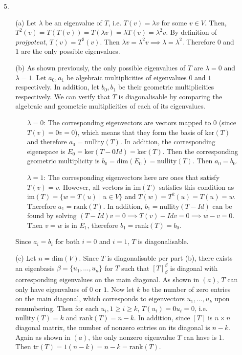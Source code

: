 \documentclass{article}
\begin{document}
\newpage

\begin{itemize}
	\item [5.]
	      \begin{itemize}
		      \item [(a)] Let $\lambda$ be an eigenvalue of $T$, i.e. $T(v)=\lambda v$ for some $v\in V$. Then, $T^2(v)=T(T(v))=T(\lambda v)=\lambda T(v)=\lambda^2v$. By definition of \textit{projpotent}, $T(v)=T^2(v)$. Then $\lambda v=\lambda^2 v \implies \lambda=\lambda^2$. Therefore $0$ and $1$ are the only possible eigenvalues.
			  \item [(b)] As shown previously, the only possible eigenvalues of $T$ are $\lambda=0$ and $\lambda=1$. Let $a_0, a_1$ be algebraic multiplicities of eigenvalues $0$ and $1$ respectively. In addition, let $b_0, b_1$ be their geometric multiplicities respectively. We can verify that $T$ is diagonalisable by comparing the algebraic and geometric multiplicities of each of its eigenvalues.
			  \begin{itemize}
				  \item [$\lambda=0$:] The corresponding eigenvectors are vectors mapped to $0$ (since $T(v)=0v=0$), which means that they form the basis of $\text{ker}(T)$ and therefore $a_0=\text{nullity}(T)$. In addition, the corresponding eigenspace is $E_0=\text{ker}(T-0Id)=\text{ker}(T)$. Then the corresponding geometric multiplicity is $b_0=\text{dim}(E_0)=\text{nullity}(T)$. Then $a_0=b_0$.
				  \item [$\lambda=1$:] The corresponding eigenvectors here are ones that satisfy $T(v)=v$. However, all vectors in $\text{im}(T)$ satisfies this condition as $\text{im}(T)=\{w=T(u)\mid u\in V\}$ and $T(w)=T^2(u)=T(u)=w$. Therefore $a_1=\text{rank}(T)$. In addition, $b_1=\text{nullity}(T-Id)$ can be found by solving $(T-Id)v=0 \implies T(v)-Idv=0 \implies w-v=0$. Then $v=w$ is in $E_1$, therefore $b_1=\text{rank}(T)=b_0$.
			  \end{itemize}
			  Since $a_i=b_i$ for both $i=0$ and $i=1$, $T$ is diagonalisable.
			  \item [(c)] Let $n=\text{dim}(V)$. Since $T$ is diagonalisable per part (b), there exists an eigenbasis $\beta=\{u_1,\ldots,u_n\}$ for $T$ such that $[T]_\beta^\beta$ is diagonal with corresponding eigenvalues on the main diagonal. As shown in $(a)$, $T$ can only have eigenvalues of $0$ or $1$. Now let $k$ be the number of zero entries on the main diagonal, which corresponds to eigenvectors $u_1,\ldots,u_k$ upon renumbering. Then for each $u_i, 1\geq i\geq k$, $T(u_i)=0u_i=0$, i.e. $\text{nullity}(T)=k$ and $\text{rank}(T)=n-k$. In addition, since $[T]$ is $n\times n$ diagonal matrix, the number of nonzero entries on its diagonal is $n-k$. Again as shown in $(a)$, the only nonzero eigenvalue $T$ can have is $1$. Then $\text{tr}(T)=1(n-k)=n-k=\text{rank}(T)$.
	      \end{itemize}
\end{itemize}
\end{document}
